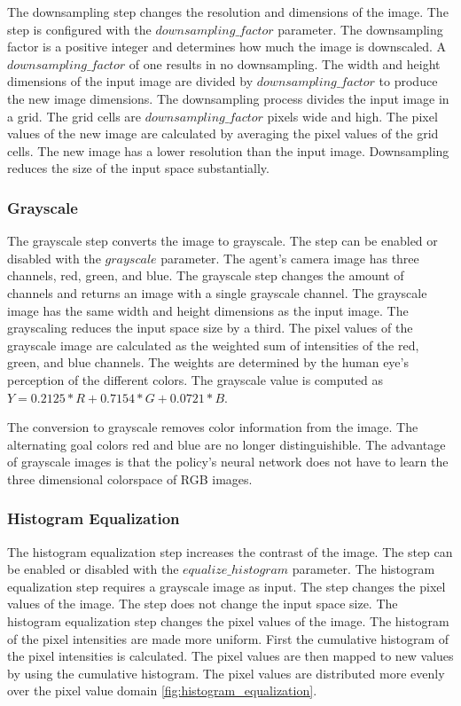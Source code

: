 The downsampling step changes the resolution and dimensions of the image. The step is configured with the $downsampling\_factor$ parameter. The downsampling factor is a positive integer and determines how much the image is downscaled. A $downsampling\_factor$ of one results in no downsampling. The width and height dimensions of the input image are divided by $downsampling\_factor$ to produce the new image dimensions.
The downsampling process divides the input image in a grid. The grid cells are $downsampling\_factor$ pixels wide and high. The pixel values of the new image are calculated by averaging the pixel values of the grid cells. The new image has a lower resolution than the input image.
Downsampling reduces the size of the input space substantially.



\subsubsection{Grayscale}

The grayscale step converts the image to grayscale. The step can be enabled or disabled with the $grayscale$ parameter. The agent's camera image has three channels, red, green, and blue. The grayscale step changes the amount of channels and returns an image with a single grayscale channel. The grayscale image has the same width and height dimensions as the input image. The grayscaling reduces the input space size by a third.
The pixel values of the grayscale image are calculated as the weighted sum of intensities of the red, green, and blue channels. The weights are determined by the human eye's perception of the different colors. The grayscale value is computed as $Y = 0.2125 * R + 0.7154 * G + 0.0721 * B$.

The conversion to grayscale removes color information from the image. The alternating goal colors red and blue are no longer distinguishible. The advantage of grayscale images is that the policy's neural network does not have to learn the three dimensional colorspace of RGB images.



\subsubsection{Histogram Equalization}

The histogram equalization step increases the contrast of the image. The step can be enabled or disabled with the $equalize\_histogram$ parameter. The histogram equalization step requires a grayscale image as input. The step changes the pixel values of the image. The step does not change the input space size.
The histogram equalization step changes the pixel values of the image. The histogram of the pixel intensities are made more uniform. First the cumulative histogram of the pixel intensities is calculated. The pixel values are then mapped to new values by using the cumulative histogram. The pixel values are distributed more evenly over the pixel value domain \ref{fig:histogram_equalization}.

